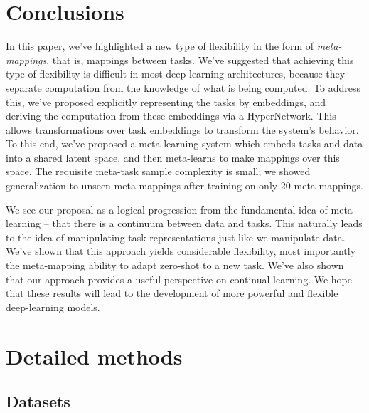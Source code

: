 \documentclass{article}
\begin{document}
\section{Conclusions}
In this paper, we've highlighted a new type of flexibility in the form of \emph{meta-mappings}, that is, mappings between tasks. We've suggested that achieving this type of flexibility is difficult in most deep learning architectures, because they separate computation from the knowledge of what is being computed. To address this, we've proposed explicitly representing the tasks by embeddings, and deriving the computation from these embeddings via a HyperNetwork. This allows transformations over task embeddings to transform the system's behavior. To this end, we've proposed a meta-learning system which embeds tasks and data into a shared latent space, and then meta-learns to make mappings over this space. The requisite meta-task sample complexity is small; we showed generalization to unseen meta-mappings after training on only 20 meta-mappings.\par
We see our proposal as a logical progression from the fundamental idea of meta-learning -- that there is a continuum between data and tasks. This naturally leads to the idea of manipulating task representations just like we manipulate data. We've shown that this approach yields considerable flexibility, most importantly the meta-mapping ability to adapt zero-shot to a new task. We've also shown that our approach provides a useful perspective on continual learning. We hope that these results will lead to the development of more powerful and flexible deep-learning models. \par




\newpage
\appendix

\section{Detailed methods} \label{app_detailed_methods}
\subsection{Datasets}
\end{document}
